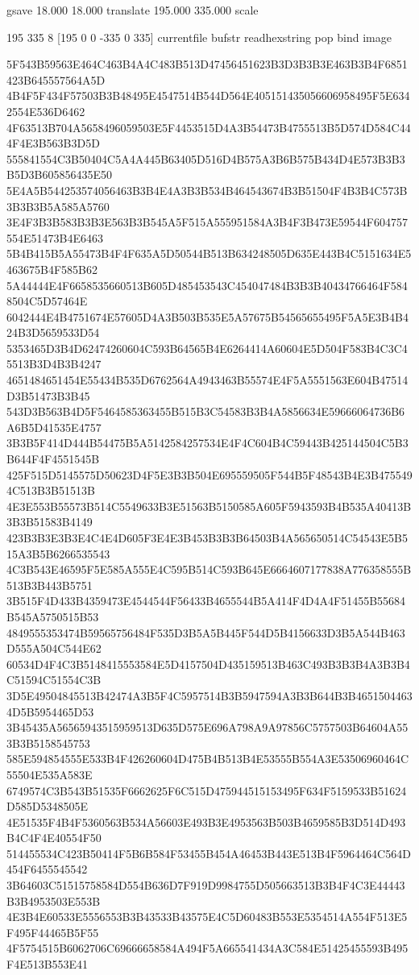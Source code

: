 {{{{{{{{{{{{{{{{{{{{{%

gsave
18.000 18.000 translate
195.000 335.000 scale

195 335 8
[195 0 0 -335 0 335]
{currentfile bufstr readhexstring pop} bind
image

5F543B59563E464C463B4A4C483B513D47456451623B3D3B3B3E463B3B4F6851423B645557564A5D
4B4F5F434F57503B3B48495E4547514B544D564E405151435056606958495F5E6342554E536D6462
4F63513B704A5658496059503E5F4453515D4A3B54473B4755513B5D574D584C444F4E3B563B3D5D
555841554C3B50404C5A4A445B63405D516D4B575A3B6B575B434D4E573B3B3B5D3B605856435E50
5E4A5B544253574056463B3B4E4A3B3B534B464543674B3B51504F4B3B4C573B3B3B3B5A585A5760
3E4F3B3B583B3B3E563B3B545A5F515A555951584A3B4F3B473E59544F604757554E51473B4E6463
5B4B415B5A55473B4F4F635A5D50544B513B634248505D635E443B4C5151634E5463675B4F585B62
5A44444E4F6658535660513B605D485453543C454047484B3B3B40434766464F5848504C5D57464E
6042444E4B4751674E57605D4A3B503B535E5A57675B54565655495F5A5E3B4B424B3D5659533D54
5353465D3B4D62474260604C593B64565B4E6264414A60604E5D504F583B4C3C45513B3D4B3B4247
4651484651454E55434B535D6762564A4943463B55574E4F5A5551563E604B47514D3B51473B3B45
543D3B563B4D5F5464585363455B515B3C54583B3B4A5856634E59666064736B6A6B5D41535E4757
3B3B5F414D444B54475B5A5142584257534E4F4C604B4C59443B425144504C5B3B644F4F4551545B
425F515D5145575D50623D4F5E3B3B504E695559505F544B5F48543B4E3B4755494C513B3B51513B
4E3E553B55573B514C5549633B3E51563B5150585A605F5943593B4B535A40413B3B3B51583B4149
423B3B3E3B3E4C4E4D605F3E4E3B453B3B3B64503B4A565650514C54543E5B515A3B5B6266535543
4C3B543E46595F5E585A555E4C595B514C593B645E6664607177838A776358555B513B3B443B5751
3B515F4D433B4359473E4544544F56433B4655544B5A414F4D4A4F51455B55684B545A5750515B53
4849555353474B59565756484F535D3B5A5B445F544D5B4156633D3B5A544B463D555A504C544E62
60534D4F4C3B5148415553584E5D4157504D435159513B463C493B3B3B4A3B3B4C51594C51554C3B
3D5E49504845513B42474A3B5F4C5957514B3B5947594A3B3B644B3B46515044634D5B5954465D53
3B45435A56565943515959513D635D575E696A798A9A97856C5757503B64604A553B3B5158545753
585E594854555E533B4F426260604D475B4B513B4E53555B554A3E53506960464C55504E535A583E
6749574C3B543B51535F6662625F6C515D475944515153495F634F5159533B51624D585D5348505E
4E51535F4B4F5360563B534A56603E493B3E4953563B503B4659585B3D514D493B4C4F4E40554F50
514455534C423B50414F5B6B584F53455B454A46453B443E513B4F5964464C564D454F6455545542
3B64603C51515758584D554B636D7F919D9984755D505663513B3B4F4C3E44443B3B4953503E553B
4E3B4E60533E5556553B3B43533B43575E4C5D60483B553E5354514A554F513E5F495F44465B5F55
4F5754515B6062706C69666658584A494F5A665541434A3C584E51425455593B495F4E513B553E41
}}}}}}}}}}}}}}}}}}}}}
